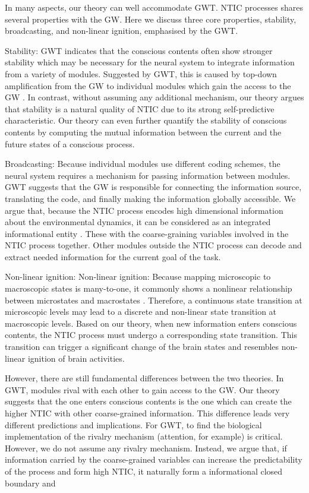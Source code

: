 \documentclass[utf8]{article}
\begin{document}
		In many aspects, our theory can well accommodate GWT. NTIC processes shares several properties with the GW. Here we discuss three core properties, stability, broadcasting, and non-linear ignition, emphasised by the GWT. 

		Stability: GWT indicates that the conscious contents often show stronger stability which may be necessary for the neural system to integrate information from a variety of modules. Suggested by GWT, this is caused by top-down amplification from the GW to individual modules which gain the access to the GW \needref{}. In contrast, without assuming any additional mechanism, our theory argues that stability is a natural quality of NTIC due to its strong self-predictive characteristic. Our theory can even further quantify the stability of conscious contents by computing the mutual information between the current and the future states of a conscious process. 
		
		Broadcasting: Because individual modules use different coding schemes, the neural system requires a mechanism for passing information between modules. GWT suggests that the GW is responsible for connecting the information source, translating the code, and finally making the information globally accessible. We argue that, because the NTIC process encodes high dimensional information about the environmental dynamics, it can be considered as an integrated informational entity . These with the coarse-graining variables involved in the NTIC process together. Other modules outside the NTIC process can decode and extract needed information for the current goal of the task. 
        
        
        Non-linear ignition: Non-linear ignition: Because mapping microscopic to macroscopic states is many-to-one, it commonly shows a nonlinear relationship between microstates and macrostates . Therefore, a continuous state transition at microscopic levels may lead to a discrete and non-linear state transition at macroscopic levels. Based on our theory, when new information enters conscious contents, the NTIC process must undergo a corresponding state transition. This transition can trigger a significant change of the brain states and resembles non-linear ignition of brain activities.

		However, there are still fundamental differences between the two theories. 
		In GWT, modules rival with each other to gain access to the GW. Our theory suggests that the one enters conscious contents is the one which can create the higher NTIC with other coarse-grained information. This difference leads very different predictions and implications. For GWT, to find the biological implementation of the rivalry mechanism (attention, for example) is critical. However, we do not assume any rivalry mechanism. Instead, we argue that, if  information carried by the coarse-grained variables can increase the predictability of the process and form high NTIC,  it naturally form a informational closed boundary and 
		
\end{document}
